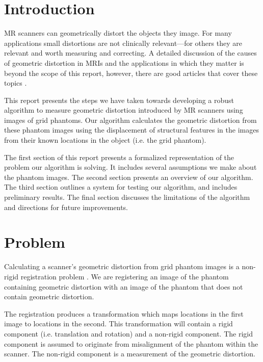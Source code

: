 \documentclass[12pt]{article}
\begin{document}
\maketitle

\section*{Introduction}
MR scanners can geometrically distort the objects they image.  For many applications small distortions are not clinically relevant---for others they are relevant and worth measuring and correcting.  A detailed discussion of the causes of geometric distortion in MRIs and the applications in which they matter is beyond the scope of this report, however, there are good articles that cover these topics \cite{baldwin2007,torfeh2015,wang2005,mribook}.  

This report presents the steps we have taken towards developing a robust algorithm to measure geometric distortion introduced by MR scanners using images of grid phantoms.  Our algorithm calculates the geometric distortion from these phantom images using the displacement of structural features in the images from their known locations in the object (i.e. the grid phantom).

The first section of this report presents a formalized representation of the problem our algorithm is solving.  It includes several assumptions we make about the phantom images.  The second section presents an overview of our algorithm.  The third section outlines a system for testing our algorithm, and includes preliminary results.  The final section discusses the limitations of the algorithm and directions for future improvements.

\section*{Problem}
Calculating a scanner's geometric distortion from grid phantom images is a non-rigid registration problem \cite{hill2001}.  We are registering an image of the phantom containing geometric distortion with an image of the phantom that does not contain geometric distortion.

The registration produces a transformation which maps locations in the first image to locations in the second.  This transformation will contain a rigid component (i.e. translation and rotation) and a non-rigid component.  The rigid component is assumed to originate from misalignment of the phantom within the scanner.  The non-rigid component is a measurement of the geometric distortion.
\end{document}
